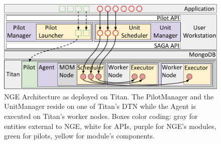
\begin{figure}
  \centering
   \includegraphics[width=\columnwidth]{figures/rp_architecture_compact_atlaswms_paper.pdf}
  \caption{NGE Architecture as deployed on Titan. The PilotManager and the
  UnitManager reside on one of Titan's DTN while the Agent is executed on
  Titan's worker nodes. Boxes color coding: gray for entities external to NGE,
  white for APIs, purple for NGE's modules, green for pilots, yellow for
  module's components.}
\label{fig:arch-overview}
\end{figure}



